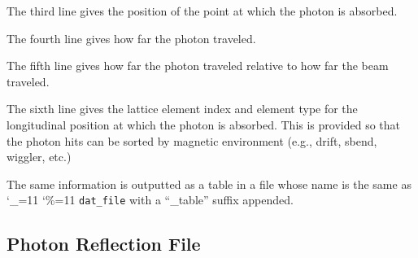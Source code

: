 \documentclass[11pt]{article}
\newcommand\ttcmd{\begingroup\catcode`\_=11 \catcode`\%=11 \dottcmd}
\newcommand\dottcmd[1]{\texttt{#1}\endgroup}
\newcommand{\vn}{\ttcmd}
\begin{document}
{{{The third line gives the position of the point at which the photon is absorbed.

The fourth line gives how far the photon traveled.

The fifth line gives how far the photon traveled relative to how far the beam traveled.

The sixth line gives the lattice element index and element type for
the longitudinal position at which the photon is absorbed. This is
provided so that the photon hits can be sorted by magnetic environment
(e.g., drift, sbend, wiggler, etc.)  

The same information is outputted as a table in a file whose name is
the same as \vn{dat_file} with a ``_table'' suffix appended.

\subsection{Photon Reflection File}
\label{ss:reflection.file}

}}}
\end{document}
